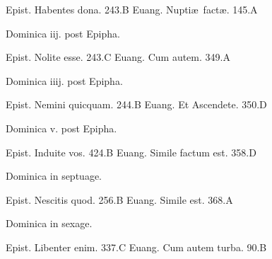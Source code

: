 \documentclass[a5paper,10pt]{book}
\def\ae{æ}
\begin{document}
\begin{multicols}{2}
\par \noindent Epist. Habentes dona. \hfill 243.B
\newline Euang. Nupti\ae \ fact\ae . \hfill 145.A
\newline \vspace{-1.75em}
\begin{center}
\color{red} Dominica iij. post Epipha.
\end{center}
\vspace{-.75em}
\par \noindent Epist. Nolite esse. \hfill 243.C
\newline Euang. Cum autem. \hfill 349.A
\newline \vspace{-1.75em}
\begin{center}
\color{red} Dominica iiij. post Epipha.
\end{center}
\vspace{-.75em}
\par \noindent 
\newline Epist. Nemini quicquam. \hfill 244.B%
\newline Euang. Et Ascendete. \hfill 350.D
\newline \vspace{-1.75em}
\begin{center}
\color{red} Dominica v. post Epipha.
\end{center}
\vspace{-.75em}
\par \noindent Epist. Induite vos. \hfill 424.B
\newline Euang. Simile factum est. \hfill 358.D
\newline \vspace{-1.75em}
\begin{center}
\color{red} Dominica in septuage.
\end{center}
\vspace{-.75em}
\par \noindent Epist. Nescitis quod. \hfill 256.B
\newline Euang. Simile est. \hfill 368.A
\newline \vspace{-1.75em}
\begin{center}
\color{red} Dominica in sexage.
\end{center}
\vspace{-.75em}
\par \noindent Epist. Libenter enim. \hfill 337.C
\newline Euang. Cum autem turba. \hfill 90.B

\end{multicols}
\end{document}
